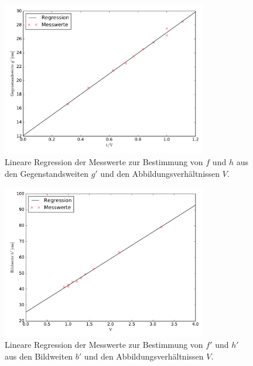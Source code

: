 \documentclass[
  parskip=half,
  bibliography=totoc,     %
  captions=tableheading,  %
  titlepage=firstiscover, %
]{scrartcl}
\begin{document}
\begin{figure}[H]
    \centering
    \includegraphics[width=0.8\textwidth]{AbbeV.pdf}
    \caption{Lineare Regression der Messwerte zur Bestimmung von $f$ und $h$ aus den Gegenstandsweiten $g'$ und den Abbildungsverhältnissen $V$.}
    \label{fig:plot_abbe_1}
\end{figure}

\begin{figure}[H]
    \centering
    \includegraphics[width=0.8\textwidth]{AbbeV2.pdf}
    \caption{Lineare Regression der Messwerte zur Bestimmung von $f'$ und $h'$ aus den Bildweiten $b'$ und den Abbildungsverhältnissen $V$.}
    \label{fig:plot_abbe_2}
\end{figure}
\end{document}
